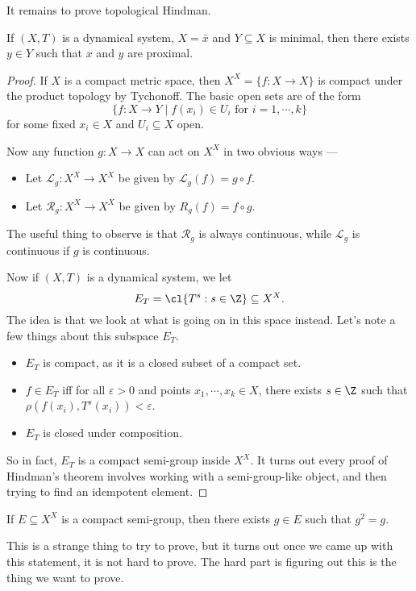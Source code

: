 \documentclass[a4paper]{article}
\begin{document}
It remains to prove topological Hindman.
\begin{thm}
  If $(X, T)$ is a dynamical system, $X = \bar{x}$ and $Y \subseteq X$ is minimal, then there exists $y \in Y$ such that $x$ and $y$ are proximal.
\end{thm}

\begin{proof}
  If $X$ is a compact metric space, then $X^X = \{f: X \to X\}$ is compact under the product topology by Tychonoff. The basic open sets are of the form
  \[
    \{f: X \to Y \mid f(x_i) \in U_i\text{ for }i = 1, \cdots, k\}
  \]
  for some fixed $x_i \in X$ and $U_i \subseteq X$ open.

  Now any function $g: X \to X$ can act on $X^X$ in two obvious ways ---
  \begin{itemize}
    \item Let $\mathcal{L}_g: X^X \to X^X$ be given by $\mathcal{L}_g(f) = g \circ f$.
    \item Let $\mathcal{R}_g: X^X \to X^X$ be given by $R_g(f) = f \circ g$.
  \end{itemize}
  The useful thing to observe is that $\mathcal{R}_g$ is always continuous, while $\mathcal{L}_g$ is continuous if $g$ is continuous.

  Now if $(X, T)$ is a dynamical system, we let
  \[
    E_T = \cl \{T^s: s \in \Z \} \subseteq X^X.
  \]
  The idea is that we look at what is going on in this space instead. Let's note a few things about this subspace $E_T$.
  \begin{itemize}
    \item $E_T$ is compact, as it is a closed subset of a compact set.
    \item $f \in E_T$ iff for all $\varepsilon > 0$ and points $x_1, \cdots, x_k \in X$, there exists $s \in \Z$ such that $\rho(f(x_i), T^s(x_i)) < \varepsilon$.
    \item $E_T$ is closed under composition.
  \end{itemize}
  So in fact, $E_T$ is a compact semi-group inside $X^X$. It turns out every proof of Hindman's theorem involves working with a semi-group-like object, and then trying to find an idempotent element.
\end{proof}

\begin{thm}
  If $E \subseteq X^X$ is a compact semi-group, then there exists $g \in E$ such that $g^2 = g$.
\end{thm}
This is a strange thing to try to prove, but it turns out once we came up with this statement, it is not hard to prove. The hard part is figuring out this is the thing we want to prove.
\end{document}
